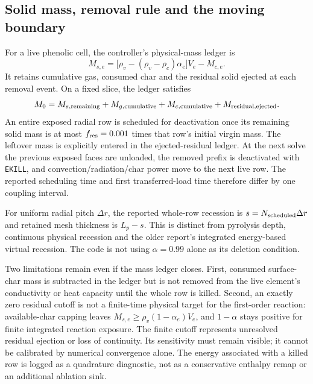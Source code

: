 \subsection{Solid mass, removal rule and the moving boundary}
For a live phenolic cell, the controller's physical-mass ledger is
\begin{equation}
 M_{s,e}=\bigl[\rho_v-(\rho_v-\rho_c)\alpha_e\bigr]V_e-M_{c,e}.
\end{equation}
It retains cumulative gas, consumed char and the residual solid ejected at each removal event. On a fixed slice, the ledger satisfies
\begin{equation}
 M_0=M_{s,\rm remaining}+M_{g,\rm cumulative}+M_{c,\rm cumulative}+M_{\rm residual,ejected}.
\end{equation}
An entire exposed radial row is scheduled for deactivation once its remaining solid mass is at most $f_{\rm res}=0.001$ times that row's initial virgin mass. The leftover mass is explicitly entered in the ejected-residual ledger. At the next solve the previous exposed faces are unloaded, the removed prefix is deactivated with \texttt{EKILL}, and convection/radiation/char power move to the next live row. The reported scheduling time and first transferred-load time therefore differ by one coupling interval.

For uniform radial pitch $\Delta r$, the reported whole-row recession is $s=N_{\rm scheduled}\Delta r$ and retained mesh thickness is $L_p-s$. This is distinct from pyrolysis depth, continuous physical recession and the older report's integrated energy-based virtual recession. The code is not using $\alpha=0.99$ alone as its deletion condition.

Two limitations remain even if the mass ledger closes. First, consumed surface-char mass is subtracted in the ledger but is not removed from the live element's conductivity or heat capacity until the whole row is killed. Second, an exactly zero residual cutoff is not a finite-time physical target for the first-order reaction: available-char capping leaves $M_{s,e}\geq\rho_v(1-\alpha_e)V_e$, and $1-\alpha$ stays positive for finite integrated reaction exposure. The finite cutoff represents unresolved residual ejection or loss of continuity. Its sensitivity must remain visible; it cannot be calibrated by numerical convergence alone. The energy associated with a killed row is logged as a quadrature diagnostic, not as a conservative enthalpy remap or an additional ablation sink.

